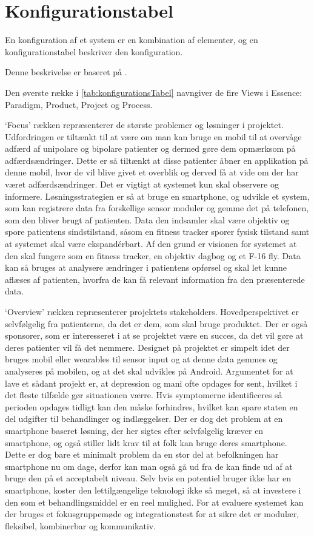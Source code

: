 \section{Konfigurationstabel}
En konfiguration af et system er en kombination af elementer, og en konfigurationstabel beskriver den konfiguration.

Denne beskrivelse er baseret på \citet[Afsnit 3.2, Side 16-21]{art:essence}.

Den øverste række i \cref{tab:konfigurationsTabel} navngiver de fire Views i Essence: Paradigm, Product, Project og Process.

`Focus' rækken repræsenterer de største problemer og løsninger i projektet. 
Udfordringen er tiltænkt til at være om man kan bruge en mobil til at overvåge adfærd af unipolare og bipolare patienter og dermed gøre dem opmærksom på adfærdsændringer.
Dette er så tiltænkt at disse patienter åbner en applikation på denne mobil, hvor de vil blive givet et overblik og derved få at vide om der har været adfærdsændringer. 
Det er vigtigt at systemet kun skal observere og informere.
Løsningsstrategien er så at bruge en smartphone, og udvikle et system, som kan registrere data fra forskellige sensor moduler og gemme det på telefonen, som den bliver brugt af patienten.
Data den indsamler skal være objektiv og spore patientens sindstilstand, såsom en fitness tracker sporer fysisk tilstand samt at systemet skal være ekspandérbart.
Af den grund er visionen for systemet at den skal fungere som en fitness tracker, en objektiv dagbog og et F-16 fly.
Data kan så bruges at analysere ændringer i patientens opførsel og skal let kunne aflæses af patienten, hvorfra de kan få relevant information fra den præsenterede data. 

`Overview' rækken repræsenterer projektets stakeholders. Hovedperspektivet er selvfølgelig fra patienterne, da det er dem, som skal bruge produktet.
Der er også sponsorer, som er interesseret i at se projektet være en succes, da det vil gøre at deres patienter vil få det nemmere. 
Designet på projektet er simpelt idet der bruges mobil eller wearables til sensor input og at denne data gemmes og analyseres på mobilen, og at det skal udvikles på Android.
Argumentet for at lave et sådant projekt er, at depression og mani ofte opdages for sent, hvilket i det fleste tilfælde gør situationen værre.
Hvis symptomerne identificeres så perioden opdages tidligt kan den måske forhindres, hvilket kan spare staten en del udgifter til behandlinger og indlæggelser.
Der er dog det problem at en smartphone baseret løsning, der her sigtes efter selvfølgelig kræver en smartphone, og også stiller lidt krav til at folk kan bruge deres smartphone.
Dette er dog bare et minimalt problem da en stor del at befolkningen har smartphone nu om dage, derfor kan man også gå ud fra de kan finde ud af at bruge den på et acceptabelt niveau.
Selv hvis en potentiel bruger ikke har en smartphone, koster den lettilgængelige teknologi ikke så meget, så at investere i den som et behandlingsmiddel er en reel mulighed.
For at evaluere systemet kan der bruges et fokusgruppemøde og integrationstest for at sikre det er modulær, fleksibel, kombinerbar og kommunikativ.

